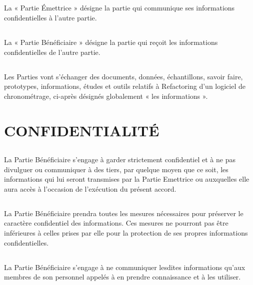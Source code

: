 \documentclass[]{karlito}
\newcommand{\projectName}{Refactoring d'un logiciel de chronométrage}
\begin{document}
\section{}La « Partie Émettrice » désigne la partie qui communique ses informations confidentielles à l’autre partie.

\section{}La « Partie Bénéficiaire » désigne la partie qui reçoit les informations confidentielles de l’autre partie.

\section{}Les Parties vont s’échanger des documents, données, échantillons, savoir faire, prototypes, informations, études et outils relatifs à \projectName, ci-après désignés globalement « les informations ».




\chapter{CONFIDENTIALITÉ}
\section{}La Partie Bénéficiaire s’engage à garder strictement confidentiel et à ne pas divulguer ou communiquer à des tiers, par quelque moyen que ce soit, les informations qui lui seront transmises par la Partie Emettrice ou auxquelles elle aura accès à l’occasion de l’exécution du présent accord.

\section{}La Partie Bénéficiaire prendra toutes les mesures nécessaires pour préserver le caractère confidentiel des informations. Ces mesures ne pourront pas être inférieures à celles prises par elle pour la protection de ses propres informations confidentielles.


\section{}\label{subContract}La Partie Bénéficiaire s’engage à ne communiquer lesdites informations qu’aux membres de son personnel appelés à en prendre connaissance et à les utiliser.
\end{document}
